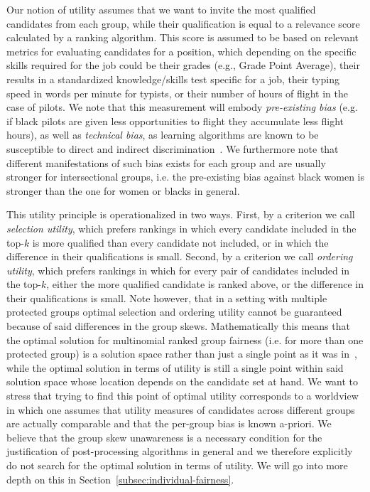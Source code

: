 Our notion of utility assumes that we want to invite the most qualified candidates from each group, while their qualification is equal to a relevance score calculated by a ranking algorithm.
%
This score is assumed to be based on relevant metrics for evaluating candidates for a position, which depending on the specific skills required for the job could be their grades (e.g., Grade Point Average), their results in a standardized knowledge/skills test specific for a job, their typing speed in words per minute for typists, or their number of hours of flight in the case of pilots.
%
We note that this measurement will embody \emph{pre-existing bias} (e.g. if black pilots are given less opportunities to flight they accumulate less flight hours), as well as \emph{technical bias}, as learning algorithms are known to be susceptible to direct and indirect discrimination~\cite{tuto2016,HajianFerrer12}.
%
We furthermore note that different manifestations of such bias exists for each group and are usually stronger for intersectional groups, i.e. the pre-existing bias against black women is stronger than the one for women or blacks in general.

This utility principle is operationalized in two ways.
%
First, by a criterion we call \emph{selection utility}, which prefers rankings in which every candidate included in the top-$k$ is more qualified than every candidate not included, or in which the difference in their qualifications is small.
%
Second, by a criterion we call \emph{ordering utility}, which prefers rankings in which for every pair of candidates included in the top-$k$, either the more qualified candidate is ranked above, or the difference in their qualifications is small.
%
Note however, that in a setting with multiple protected groups optimal selection and ordering utility cannot be guaranteed because of said differences in the group skews. 
%
Mathematically this means that the optimal solution for multinomial ranked group fairness (i.e. for more than one protected group) is a solution space rather than just a single point as it was in~\cite{zehlike2017fair}, while the optimal solution in terms of utility is still a single point within said solution space whose location depends on the candidate set at hand.
%
We want to stress that trying to find this point of optimal utility corresponds to a worldview in which one assumes that utility measures of candidates across different groups are actually comparable and that the per-group bias is known a-priori.
%
We believe that the group skew unawareness is a necessary condition for the justification of post-processing algorithms in general and we therefore explicitly do not search for the optimal solution in terms of utility.
%
We will go into more depth on this in Section~\ref{subsec:individual-fairness}.


